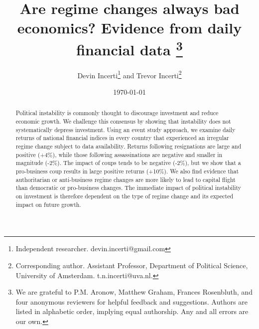\documentclass[12pt,final,fleqn]{article}
\theoremstyle{plain}
\begin{document}
\author{Devin Incerti\thanks{Independent researcher. devin.incerti@gmail.com} and Trevor Incerti\thanks{Corresponding author. Assistant Professor, Department of Political Science, University of Amsterdam.  t.n.incerti@uva.nl.}}
\title{\textbf{Are regime changes always bad economics? Evidence from daily financial data \thanks{We are grateful to P.M. Aronow, Matthew Graham, Frances Rosenbluth, and four anonymous reviewers for helpful feedback and suggestions. Authors are listed in alphabetic order, implying equal authorship. Any and all errors are our own.}}}
\date{\today}
\maketitle
\thispagestyle{empty}

\singlespacing
\begin{abstract}
\noindent
Political instability is commonly thought to discourage investment and reduce economic growth. We challenge this consensus by showing that instability does not systematically depress investment. Using an event study approach, we examine daily returns of national financial indices in every country that experienced an irregular regime change subject to data availability. Returns following resignations are large and positive (+4\%), while those following assassinations are negative and smaller in magnitude (-2\%). The impact of coups tends to be negative (-2\%), but we show that a pro-business coup results in large positive returns (+10\%). We also find evidence that authoritarian or anti-business regime changes are more likely to lead to capital flight than democratic or pro-business changes.  The immediate impact of political instability on investment is therefore dependent on the type of regime change and its expected impact on future growth. 


\end{abstract}
\doublespacing

\clearpage
{}

\newpage
\end{document}

